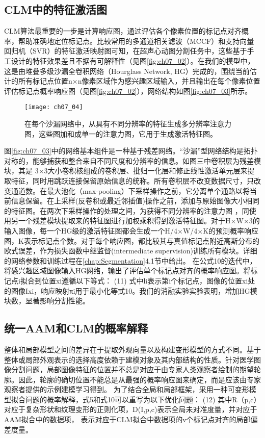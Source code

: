 \subsection{CLM中的特征激活图}
CLM算法最重要的一步是计算响应图，通过评估各个像素位置的标记点对齐概率，帮助准确地定位标记点。比较常用的多通道相关滤波（MCCF）\citep{Galoogahi2016}和支持向量回归机（SVR）\citep{Jan2017}的特征激活映射图可知，在超声心动图分割任务中，这些基于手工设计的特征效果差且不据有可解释性（见图\ref{fig:ch07_02}）。在我们的模型中，这是由堆叠多级沙漏全卷积网络（Hourglass Network, HG）\citep{Newell2016a}完成的，围绕当前估计的所有标记点位置n×n像素区域作为感兴趣区域输入，并且输出在每个像素位置评估标记点概率响应图（见图\ref{fig:ch07_02}），网络结构如图\ref{fig:ch07_03}所示。 
\begin{figure}[!htbp]
\centering
\texttt{[image: ch07\_04]}
\caption{在每个沙漏网络中，从具有不同分辨率的特征生成多分辨率注意力图，这些图加和成单一的注意力图，它用于生成激活特征图。}
\label{fig:ch07_04}
\end{figure} 
 

	图\ref{fig:ch07_03}中的网络基本组件是一种基于残差网络\citep{he15}。“沙漏”型网络结构是拓扑对称的，能够捕获和整合来自不同尺度和分辨率的信息。如图三中卷积层为残差模块，其是 3×3大小卷积核组成的卷积层、批归一化层和修正线性激活单元层来提取特征，同时用跳跃连接保留原始信息的统称。所有卷积层不改变数据尺寸，只改变通道数。在最大池化（max-pooling）下采样操作之前，它分离单个通路以将当前信息保留。在上采样(反卷积或最近邻插值)操作之前，添加与原始图像大小相同的特征图。在两次下采样操作的处理之间，为获得不同分辨率的注意力图\citep{Chu2017} ，同使用另一个残差模块提取来的特征图进行加权乘积得到激活特征图。对于H×W×3的输入图像，每一个HG级的激活特征图都会生成一个H/4×W/4×K的预测概率响应图，K表示标记点个数。对于每个响应图，都比较其与真值标记点附近高斯分布的欧式误差，作为损失函数中继监督(intermediate supervision)训练所有模块。详细的网络参数和训练过程在\ref{chap:Segmentation}4.1节中给出。
在公式10的迭代中，将感兴趣区域图像输入HG网络，输出了评估单个标记点对齐的概率响应图。将标记点i拟合到位置xi遵循以下等式： 
	  	(11)
式中li表示第i个标记点，图像的位置xi处的图像Ixi，响应映射πi用于最小化等式10。我们的消融实验实验表明，增加HG模块数，显著影响分割性能。

\subsection{统一AAM和CLM的概率解释}
整体和局部模型之间的差异在于提取外观向量以及构建变形模型的方式不同。基于整体或局部外观表示的选择高度依赖于建模对象及其内部结构的性质。针对医学图像分割问题，局部图像特征的位置并不总是对应于由专家人类观察者绘制的期望轮廓。因此，轮廓的确切位置不能总是从最强的概率响应图来确定，而是应该由专家观察者提供的示例建模学习得到。
为了结合全局和局部框架，采用一种可变形模型拟合问题的概率解释，式5和式10可以重写为以下优化问题：
    (12)
其中R（p,c）对应于复杂形状和纹理变形的正则化项，D(I,p,c)表示全局未对准度量，并对应于AAM拟合中的数据项， 表示对应于CLM拟合中数据项的v个标记点对齐的局部偏差度量。

